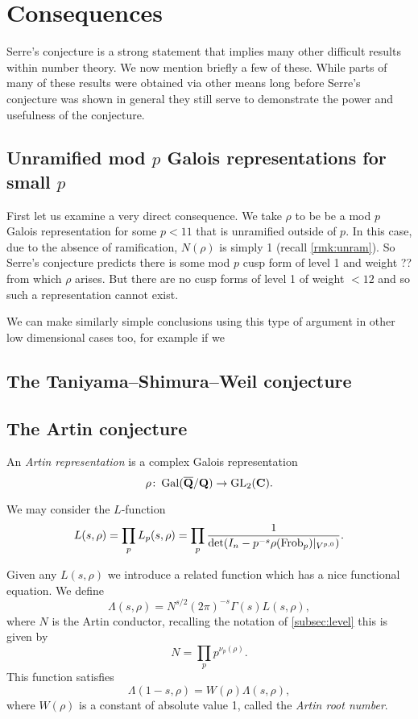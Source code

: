 \documentclass[a4paper,12pt]{article}
\begin{document}
\section{Consequences}
Serre's conjecture is a strong statement that implies many other difficult results within number theory.
We now mention briefly a few of these.
While parts of many of these results were obtained via other means long before Serre's conjecture was shown in general they still serve to demonstrate the power and usefulness of the conjecture.


\subsection{Unramified mod $p$ Galois representations for small $p$}
First let us examine a very direct consequence. %
We take $\rho$ to be be a mod $p$ Galois representation for some $p < 11$ that is unramified outside of $p$.
In this case, due to the absence of ramification, $N(\rho)$ is simply 1 (recall \cref{rmk:unram}). %
So Serre's conjecture predicts there is some mod $p$ cusp form of level 1 and weight ?? from which $\rho$ arises.
But there are no cusp forms of level 1 of weight $< 12$ and so such a representation cannot exist.

We can make similarly simple conclusions using this type of argument in other low dimensional cases too, for example if we 


\subsection{The Taniyama--Shimura--Weil conjecture}\label{sec:tan}


\subsection{The Artin conjecture}\label{sec:artin}
\begin{defn}
An \emph{Artin representation} is a complex Galois representation
\[
\rho\colon \operatorname{Gal}(\overline{\mathbf{Q}}/\mathbf{Q}) \to \operatorname{GL}_2(\mathbf{C}).
\]
\end{defn}

We may consider the $L$-function
\[
L(s, \rho) = \prod_{p} L_p(s,\rho) = \prod_{p} \frac{1}{\det(I_n - p^{-s}\rho(\operatorname{Frob}_p) |_{V^{p,0}})}.
\]

Given any $L(s,\rho)$ we introduce a related function which has a nice functional equation.
We define
\[
\Lambda(s, \rho) = N^{s/2} (2\pi)^{-s} \Gamma(s)L(s,\rho),
\]
where $N$ is the Artin conductor, recalling the notation of \cref{subsec:level} this is given by
\[
N = \prod_{p}p^{\nu_p(\rho)}.
\]
This function satisfies
\[
\Lambda(1-s, \rho) = W(\rho)\Lambda(s,\rho),
\]
where $W(\rho)$ is a constant of absolute value 1, called the \emph{Artin root number}.
\end{document}
